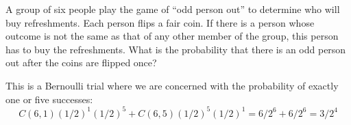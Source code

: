 \documentclass[../main.tex]{subfiles}
\begin{document}
A group of six people play the game of ``odd person out'' to determine who will buy refreshments.
Each person flips a fair coin.
If there is a person whose outcome is not the same as that of any other member of the group, this person has to buy the refreshments.
What is the probability that there is an odd person out after the coins are flipped once?

\solution
This is a Bernoulli trial where we are concerned with the probability of exactly one or five successes:
\[
	C(6, 1)(1/2)^1(1/2)^5
	+
	C(6, 5)(1/2)^5(1/2)^1
	= 
	6/2^6
	+
	6/2^6
	=
	3/2^4
\]
\end{document}
